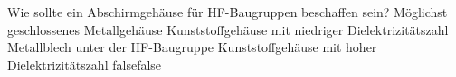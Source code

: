     {Wie sollte ein Abschirmgehäuse für HF-Baugruppen beschaffen sein?}
    {Möglichst geschlossenes Metallgehäuse }
    {Kunststoffgehäuse mit niedriger Dielektrizitätszahl}
    {Metallblech unter der HF-Baugruppe}
    {Kunststoffgehäuse mit hoher Dielektrizitätszahl}
    {false}{false}
